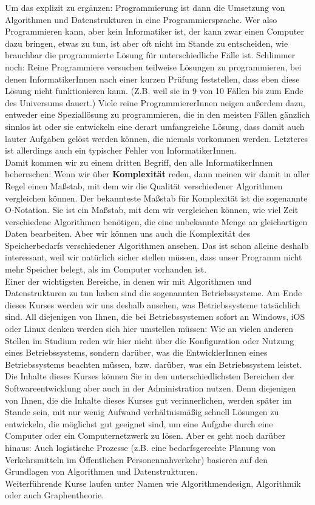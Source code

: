 Um das explizit zu ergänzen: Programmierung ist dann die Umsetzung von Algorithmen und Datenstrukturen in eine Programmiersprache. Wer also Programmieren kann, aber kein Informatiker ist, der kann zwar einen Computer dazu bringen, etwas zu tun, ist aber oft nicht im Stande zu entscheiden, wie brauchbar die programmierte Lösung für unterschiedliche Fälle ist. Schlimmer noch: Reine Programmiere versuchen teilweise Lösungen zu programmieren, bei denen InformatikerInnen nach einer kurzen Prüfung feststellen, dass eben diese Lösung nicht funktionieren kann. (Z.B. weil sie in 9 von 10 Fällen bis zum Ende des Universums dauert.) Viele reine ProgrammiererInnen neigen außerdem dazu, entweder eine Speziallösung zu programmieren, die in den meisten Fällen gänzlich sinnlos ist oder sie entwickeln eine derart umfangreiche Lösung, dass damit auch lauter Aufgaben gelöst werden können, die niemals vorkommen werden. Letzteres ist allerdings auch ein typischer Fehler von InformatikerInnen.\\

Damit kommen wir zu einem dritten Begriff, den alle InformatikerInnen beherrschen: Wenn wir über \textbf{Komplexität} reden, dann meinen wir damit in aller Regel einen Maßstab, mit dem wir die Qualität verschiedener Algorithmen vergleichen können. Der bekannteste Maßstab für Komplexität ist die sogenannte O-Notation. Sie ist ein Maßstab, mit dem wir vergleichen können, wie viel Zeit verschiedene Algorithmen benötigen, die eine unbekannte Menge an gleichartigen Daten bearbeiten. Aber wir können uns auch die Komplexität des Speicherbedarfs verschiedener Algorithmen ansehen. Das ist schon alleine deshalb interessant, weil wir natürlich sicher stellen müssen, dass unser Programm nicht mehr Speicher belegt, als im Computer vorhanden ist.\\

Einer der wichtigsten Bereiche, in denen wir mit Algorithmen und Datenstrukturen zu tun haben sind die sogenannten Betriebssysteme. Am Ende dieses Kurses werden wir uns deshalb ansehen, was Betriebssysteme tatsächlich sind. All diejenigen von Ihnen, die bei Betriebssystemen sofort an Windows, iOS oder Linux denken werden sich hier umstellen müssen: Wie an vielen anderen Stellen im Studium reden wir hier nicht über die Konfiguration oder Nutzung eines Betriebssystems, sondern darüber, was die EntwicklerInnen eines Betriebssystems beachten müssen, bzw. darüber, was ein Betriebssystem leistet.\\

Die Inhalte dieses Kurses können Sie in den unterschiedlichsten Bereichen der Softwareentwicklung aber auch in der Administration nutzen. Denn diejenigen von Ihnen, die die Inhalte dieses Kurses gut verinnerlichen, werden später im Stande sein, mit nur wenig Aufwand verhältnismäßig schnell Lösungen zu entwickeln, die möglichst gut geeignet sind, um eine Aufgabe durch eine Computer oder ein Computernetzwerk zu lösen. Aber es geht noch darüber hinaus: Auch logistische Prozesse (z.B. eine bedarfsgerechte Planung von Verkehrsmitteln im Öffentlichen Personennahverkehr) basieren auf den Grundlagen von Algorithmen und Datenstrukturen.\\

Weiterführende Kurse laufen unter Namen wie Algorithmendesign, Algorithmik oder auch Graphentheorie.